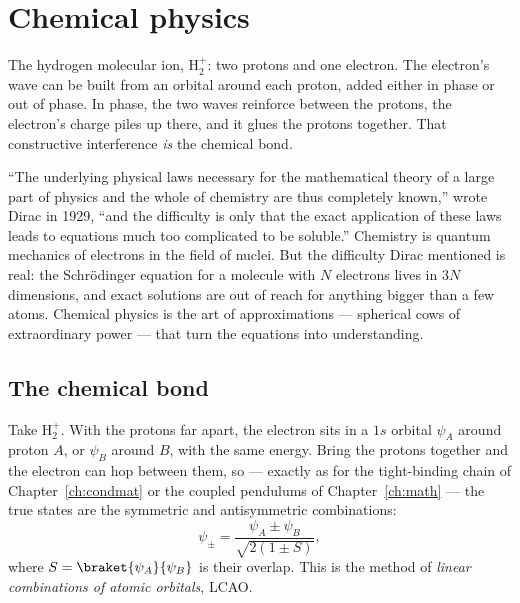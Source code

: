 \chapter{Chemical physics}
\label{ch:chem}



\begin{prototype}
The hydrogen molecular ion, H$_2^+$: two protons and one electron. The electron's wave can be built from an orbital around each proton, added either in phase or out of phase. In phase, the two waves reinforce between the protons, the electron's charge piles up there, and it glues the protons together. That constructive interference \emph{is} the chemical bond.
\end{prototype}

``The underlying physical laws necessary for the mathematical theory of a large part of physics and the whole of chemistry are thus completely known,'' wrote Dirac in 1929, ``and the difficulty is only that the exact application of these laws leads to equations much too complicated to be soluble.'' Chemistry is quantum mechanics of electrons in the field of nuclei. But the difficulty Dirac mentioned is real: the Schr\"odinger equation for a molecule with $N$ electrons lives in $3N$ dimensions, and exact solutions are out of reach for anything bigger than a few atoms. Chemical physics is the art of approximations --- spherical cows of extraordinary power --- that turn the equations into understanding.

\section{The chemical bond}

Take H$_2^+$. With the protons far apart, the electron sits in a $1s$ orbital $\psi_A$ around proton $A$, or $\psi_B$ around $B$, with the same energy. Bring the protons together and the electron can hop between them, so --- exactly as for the tight-binding chain of Chapter~\ref{ch:condmat} or the coupled pendulums of Chapter~\ref{ch:math} --- the true states are the symmetric and antisymmetric combinations:
\[
  \psi_\pm = \frac{\psi_A\pm\psi_B}{\sqrt{2(1\pm S)}},
\]
where $S = \braket{\psi_A}{\psi_B}$ is their overlap. This is the method of \emph{linear combinations of atomic orbitals}, LCAO.

